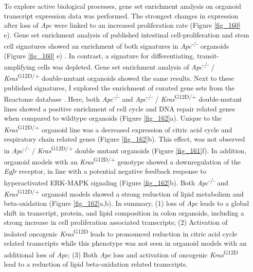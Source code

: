 \begin{flushleft}
To explore active biological processes, gene set enrichment analysis on organoid transcript expression data was performed. The strongest changes in expression after loss of \textit{Apc} were linked to an increased proliferation rate (Figure \ref{fig_160} e). Gene set enrichment analysis of published intestinal cell-proliferation and stem cell signatures showed an enrichment of both signatures in \textit{Apc}\textsuperscript{-/-}  organoids (Figure \ref{fig_160} e) \citep{merlos-suarezIntestinalStemCell2011}. In contrast, a signature for differentiating, transit-amplifying cells was depleted. Gene set enrichment analysis of \textit{Apc}\textsuperscript{-/-} / \textit{Kras}\textsuperscript{G12D/+} double-mutant organoids showed the same results. Next to these published signatures, I explored the enrichment of curated gene sets from the Reactome database \citep{grissReactomeGSAEfficientMultiOmics2020}. Here, both \textit{Apc}\textsuperscript{-/-}  and \textit{Apc}\textsuperscript{-/-} / \textit{Kras}\textsuperscript{G12D/+} double-mutant lines showed a positive enrichment of cell cycle and DNA repair related genes when compared to wildtype organoids (Figure \ref{fig_162}a). Unique to the \textit{Kras}\textsuperscript{G12D/+} organoid line was a decreased expression of citric acid cycle and respiratory chain related genes (Figure \ref{fig_162}b). This effect, was not observed in \textit{Apc}\textsuperscript{-/-} / \textit{Kras}\textsuperscript{G12D/+} double mutant organoids (Figure \ref{fig_161}f). In addition, organoid models with an \textit{Kras}\textsuperscript{G12D/+} genotype showed a downregulation of the \textit{Egfr} receptor, in line with a potential negative feedback response to hyperactivated ERK-MAPK signaling (Figure \ref{fig_162}b). Both \textit{Apc}\textsuperscript{-/-}  and \textit{Kras}\textsuperscript{G12D/+} organoid models showed a strong reduction of lipid metabolism and beta-oxidation (Figure \ref{fig_162}a,b). In summary, (1) loss of \textit{Apc} leads to a global shift in transcript, protein, and lipid composition in colon organoids, including a strong increase in cell proliferation associated transcripts; (2) Activation of isolated oncogenic \textit{Kras}\textsuperscript{G12D} leads to pronounced reduction in citric acid cycle related transcripts while this phenotype was not seen in organoid models with an additional loss of \textit{Apc}; (3) Both \textit{Apc} loss and activation of oncogenic \textit{Kras}\textsuperscript{G12D} lead to a reduction of lipid beta-oxidation related transcripts.


\end{flushleft}
